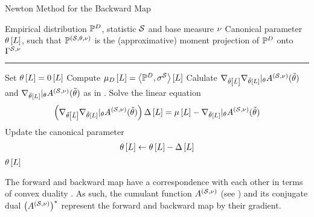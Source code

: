 \begin{algorithm}
    \caption{Newton Method for the Backward Map}\label{alg:newtonBackward}
    \begin{algorithmic}
        \Require Empirical distribution $\mathbb{P}^{D}$, statistic $\mathcal{S}$ and base measure $\nu$
        \Ensure Canonical parameter $\theta\left[L\right]$, such that $\mathbb{P}^{(\mathcal{S},\theta,\nu)}$ is the (approximative) moment projection of $\mathbb{P}^{D}$ onto $\Gamma^{\mathcal{S},\nu}$
        \hrule
        \State Set $\theta\left[L\right]=0\left[L\right]$
        \State Compute $\mu_{D}\left[L\right]= \left\langle \mathbb{P}^{D},\sigma^{\mathcal{S}}\right\rangle \left[ L \right]$
            \State Calulate $\nabla_{\tilde{\theta}\left[\tilde{L}\right]}\nabla_{\tilde{\theta}\left[L\right]}|_{\theta} A^{(\mathcal{S},\nu)}(\tilde{\theta})$ and  $\nabla_{\tilde{\theta}\left[L\right]}|_{\theta} A^{(\mathcal{S},\nu)}(\tilde{\theta})$ as in . %
            \State Solve the linear equation
            \begin{align*}
                \left(\nabla_{\tilde{\theta}\left[\tilde{L}\right]}\nabla_{\tilde{\theta}\left[L\right]}|_{\theta} A^{(\mathcal{S},\nu)}(\tilde{\theta})\right)  \Delta\left[L\right]
                = \mu\left[L\right] - \nabla_{\tilde{\theta}\left[L\right]}|_{\theta} A^{(\mathcal{S},\nu)}(\tilde{\theta})
            \end{align*}
            \State Update the canonical parameter
            \begin{align*}
                \theta\left[L\right] \leftarrow \theta\left[L\right] - \Delta\left[L\right]
            \end{align*}
        \EndWhile
        \State \Return $\theta\left[L\right]$
    \end{algorithmic}
\end{algorithm}



%

The forward and backward map have a correspondence with each other in terms of convex duality \cite{rockafellar_convex_1997}.
As such, the cumulant function $A^{(\mathcal{S},\nu)}$ (see ) and its conjugate dual $\big(A^{(\mathcal{S},\nu)}\big)^*$ represent the forward and backward map by their gradient.

